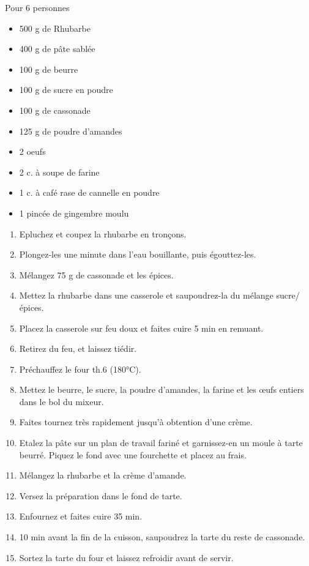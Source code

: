\bigskip
\label{TarteRhubarbe}
{Pour 6 personnes}{\begin{itemize}
	\item 500 g de Rhubarbe 
	\item 400 g de pâte sablée
	\item 100 g de beurre
	\item 100 g de sucre en poudre
	\item 100 g de cassonade
	\item 125 g de poudre d'amandes
	\item 2 oeufs
	\item 2 c. à soupe de farine
	\item 1 c. à café rase de cannelle en poudre
	\item 1 pincée de gingembre moulu
\end{itemize}}
{\begin{enumerate}
	\item Epluchez et coupez la rhubarbe en tronçons.
	\item Plongez-les une minute dans l’eau bouillante, puis égouttez-les.
	\item Mélangez 75 g de cassonade et les épices.
	\item Mettez la rhubarbe dans une casserole et saupoudrez-la du mélange sucre/épices.
	\item Placez la casserole sur feu doux et faites cuire 5 min en remuant.
	\item Retirez du feu, et laissez tiédir.
	\item Préchauffez le four th.6 (180°C).
	\item Mettez le beurre, le sucre, la poudre d’amandes, la farine et les œufs entiers dans le bol du mixeur.
	\item Faites tournez très rapidement jusqu’à obtention d’une crème.
	\item Etalez la pâte sur un plan de travail fariné et garnissez-en un moule à tarte beurré. Piquez le fond avec une fourchette et placez au frais.
	\item Mélangez la rhubarbe et la crème d’amande.
	\item Versez la préparation dans le fond de tarte.
	\item Enfournez et faites cuire 35 min.
	\item 10 min avant la fin de la cuisson, saupoudrez la tarte du reste de cassonade.
	\item Sortez la tarte du four et laissez refroidir avant de servir.
\end{enumerate}}

